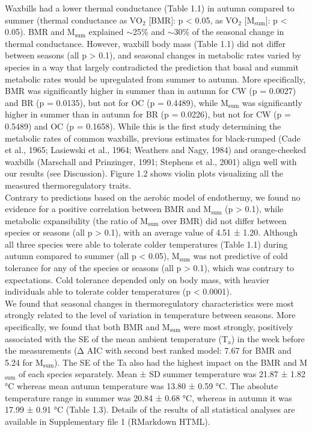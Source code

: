 \documentclass[10pt, twoside]{book} %
\begin{document}
Waxbills had a lower thermal conductance (Table 1.1) in autumn compared to summer (thermal conductance as VO$_{\text{2}}$ [BMR]: p < 0.05, as VO$_{\text{2}}$ [M$_{\text{sum}}$]: p < 0.05). BMR and M$_{\text{sum}}$ explained $\sim$25\% and $\sim$30\% of the seasonal change in thermal conductance. However, waxbill body mass (Table 1.1) did not differ between seasons (all p > 0.1), and seasonal changes in metabolic rates varied by species in a way that largely contradicted the prediction that basal and summit metabolic rates would be upregulated from summer to autumn. More specifically, BMR was significantly higher in summer than in autumn for CW (p = 0.0027) and BR (p = 0.0135), but not for OC (p = 0.4489), while M$_{\text{sum}}$ was significantly higher in summer than in autumn for BR (p = 0.0226), but not for CW (p = 0.5489) and OC (p = 0.1658). While this is the first study determining the metabolic rates of common waxbills, previous estimates for black-rumped (Cade et al., 1965; Lasiewski et al., 1964; Weathers and Nagy, 1984) and orange-cheeked waxbills (Marschall and Prinzinger, 1991; Stephens et al., 2001) align well with our results (see Discussion). Figure 1.2 shows violin plots visualizing all the measured thermoregulatory traits.\\

Contrary to predictions based on the aerobic model of endothermy, we found no evidence for a positive correlation between BMR and M$_{\text{sum}}$ (p > 0.1), while metabolic expansibility (the ratio of M$_{\text{sum}}$ over BMR) did not differ between species or seasons (all p > 0.1), with an average value of 4.51 ± 1.20. Although all three species were able to tolerate colder temperatures (Table 1.1) during autumn compared to summer (all p < 0.05), M$_{\text{sum}}$ was not predictive of cold tolerance for any of the species or seasons (all p > 0.1), which was contrary to expectations. Cold tolerance depended only on body mass, with heavier individuals able to tolerate colder temperatures (p < 0.0001).\\

We found that seasonal changes in thermoregulatory characteristics were most strongly related to the level of variation in temperature between seasons. More specifically, we found that both BMR and M$_{\text{sum}}$ were most strongly, positively associated with the SE of the mean ambient temperature (T$_{\text{a}}$) in the week before the measurements (Δ AIC with second best ranked model: 7.67 for BMR and 5.24 for M$_{\text{sum}}$). The SE of the Ta also had the highest impact on the BMR and M$_{\text{sum}}$ of each species separately. Mean ± SD summer temperature was 21.87 ± 1.82 °C whereas mean autumn temperature was 13.80 ± 0.59 °C. The absolute temperature range in summer was 20.84 ± 0.68 °C, whereas in autumn it was 17.99 ± 0.91 °C (Table 1.3). Details of the results of all statistical analyses are available in Supplementary file 1 (RMarkdown HTML).\\
\end{document}
